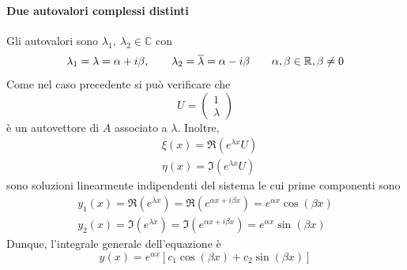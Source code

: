 \paragraph{Due autovalori complessi distinti}
Gli autovalori sono $\lambda_1,\ \lambda_2 \in \mathbb{C}$ con
\begin{equation*}
    \lambda_1=\lambda= \alpha+ i\beta, \qquad
    \lambda_2=\overline{\lambda}= \alpha- i\beta \qquad \alpha, \beta \in \mathbb{R}, \beta \neq0
\end{equation*}
Come nel caso precedente si può verificare che
\begin{equation*}
    U = \begin{pmatrix}
        1\\ 
        \lambda
        \end{pmatrix}
\end{equation*}
è un autovettore di $A$ associato a $\lambda$. Inoltre,
\begin{align}
    &\xi(x) = \Re(e^{\lambda x}U)\\
    &\eta(x)= \Im(e^{\lambda x}U)
\end{align}
sono soluzioni linearmente indipendenti del sistema le cui prime componenti sono 
\begin{align}
    y_1(x)=\Re\left(e^{\lambda x}\right) = \Re\left(e^{\alpha x + i \beta x}\right)=e^{\alpha x} \cos(\beta x)\\
    y_2(x)=\Im\left(e^{\lambda x }\right)=\Im\left(e^{\alpha x + i \beta x}\right)=e^{\alpha x} \sin(\beta x)
\end{align}
Dunque, l'integrale generale dell'equazione è
\begin{equation*}
    y(x)=e^{\alpha x}[c_1 \cos(\beta
    x) + c_2\sin(\beta x)]
\end{equation*}
